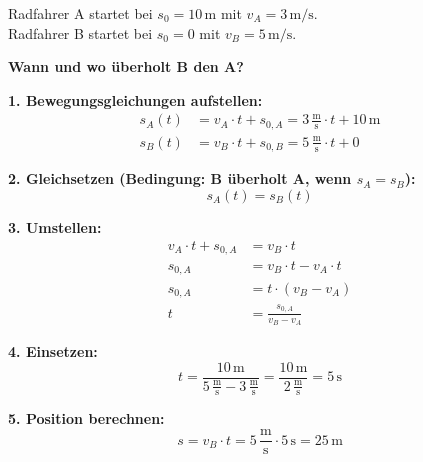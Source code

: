 \documentclass[11pt,a4paper]{article}
\begin{document}
\begin{beispiel}
Radfahrer A startet bei $s_0 = 10\,\mathrm{m}$ mit $v_A = 3\,\mathrm{m/s}$.\\
Radfahrer B startet bei $s_0 = 0$ mit $v_B = 5\,\mathrm{m/s}$.

\textbf{Wann und wo überholt B den A?}

\textbf{1. Bewegungsgleichungen aufstellen:}
\begin{align*}
s_A(t) &= v_A \cdot t + s_{0,A} = 3\,\frac{\mathrm{m}}{\mathrm{s}} \cdot t + 10\,\mathrm{m} \\
s_B(t) &= v_B \cdot t + s_{0,B} = 5\,\frac{\mathrm{m}}{\mathrm{s}} \cdot t + 0
\end{align*}

\textbf{2. Gleichsetzen (Bedingung: B überholt A, wenn $s_A = s_B$):}
\[
s_A(t) = s_B(t)
\]

\textbf{3. Umstellen:}
\begin{align*}
v_A \cdot t + s_{0,A} &= v_B \cdot t \\
s_{0,A} &= v_B \cdot t - v_A \cdot t \\
s_{0,A} &= t \cdot (v_B - v_A) \\
t &= \frac{s_{0,A}}{v_B - v_A}
\end{align*}

\textbf{4. Einsetzen:}
\[
t = \frac{10\,\mathrm{m}}{5\,\frac{\mathrm{m}}{\mathrm{s}} - 3\,\frac{\mathrm{m}}{\mathrm{s}}} = \frac{10\,\mathrm{m}}{2\,\frac{\mathrm{m}}{\mathrm{s}}} = \boxed{5\,\mathrm{s}}
\]

\textbf{5. Position berechnen:}
\[
s = v_B \cdot t = 5\,\frac{\mathrm{m}}{\mathrm{s}} \cdot 5\,\mathrm{s} = \boxed{25\,\mathrm{m}}
\]
\end{beispiel}
\end{document}
